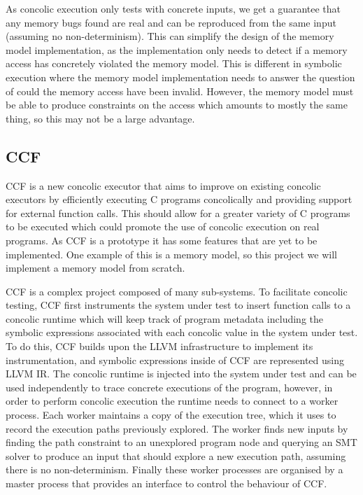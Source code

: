 \documentclass[12pt,twoside]{report}
\begin{document}
As concolic execution only tests with concrete inputs, we get a guarantee that any memory bugs found are real and can be reproduced from the same input (assuming no non-determinism). This can simplify the design of the memory model implementation, as the implementation only needs to detect if a memory access has concretely violated the memory model. This is different in symbolic execution where the memory model implementation needs to answer the question of could the memory access have been invalid. However, the memory model must be able to produce constraints on the access which amounts to mostly the same thing, so this may not be a large advantage.

\subsection{CCF}
CCF is a new concolic executor that aims to improve on existing concolic executors by efficiently executing C programs concolically and providing support for external function calls. This should allow for a greater variety of C programs to be executed which could promote the use of concolic execution on real programs. As CCF is a prototype it has some features that are yet to be implemented. One example of this is a memory model, so this project we will implement a memory model from scratch.

CCF is a complex project composed of many sub-systems. To facilitate concolic testing, CCF first instruments the system under test to insert function calls to a concolic runtime which will keep track of program metadata including the symbolic expressions associated with each concolic value in the system under test. To do this, CCF builds upon the LLVM infrastructure to implement its instrumentation, and symbolic expressions inside of CCF are represented using LLVM IR. The concolic runtime is injected into the system under test and can be used independently to trace concrete executions of the program, however, in order to perform concolic execution the runtime needs to connect to a worker process. Each worker maintains a copy of the execution tree, which it uses to record the execution paths previously explored. The worker finds new inputs by finding the path constraint to an unexplored program node and querying an SMT solver to produce an input that should explore a new execution path, assuming there is no non-determinism. Finally these worker processes are organised by a master process that provides an interface to control the behaviour of CCF.
\end{document}
